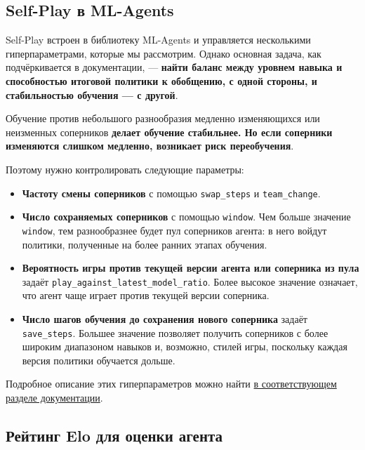 \documentclass[11pt,a4paper]{article}
\begin{document}
\subsection{Self-Play в ML-Agents}\label{self-play-in-mlagents}

Self-Play встроен в библиотеку ML-Agents и управляется несколькими гиперпараметрами, которые мы рассмотрим. Однако основная задача, как подчёркивается в документации, --- \textbf{найти баланс между уровнем навыка и способностью итоговой политики к обобщению, с одной стороны, и стабильностью обучения --- с другой}.

Обучение против небольшого разнообразия медленно изменяющихся или неизменных соперников \textbf{делает обучение стабильнее. Но если соперники изменяются слишком медленно, возникает риск переобучения}.

Поэтому нужно контролировать следующие параметры:

\begin{itemize}
\item
  \textbf{Частоту смены соперников} с помощью \texttt{swap\_steps} и \texttt{team\_change}.
\item
  \textbf{Число сохраняемых соперников} с помощью \texttt{window}. Чем больше значение \texttt{window}, тем разнообразнее будет пул соперников агента: в него войдут политики, полученные на более ранних этапах обучения.
\item
  \textbf{Вероятность игры против текущей версии агента или соперника из пула} задаёт \texttt{play\_against\_latest\_model\_ratio}. Более высокое значение означает, что агент чаще играет против текущей версии соперника.
\item
  \textbf{Число шагов обучения до сохранения нового соперника} задаёт \texttt{save\_steps}. Большее значение позволяет получить соперников с более широким диапазоном навыков и, возможно, стилей игры, поскольку каждая версия политики обучается дольше.
\end{itemize}

Подробное описание этих гиперпараметров можно найти \href{https://github.com/Unity-Technologies/ml-agents/blob/develop/docs/Training-Configuration-File.md\#self-play}{в соответствующем разделе документации}.

\subsection{Рейтинг Elo для оценки агента}\label{the-elo-score-to-evaluate-our-agent}
\end{document}
